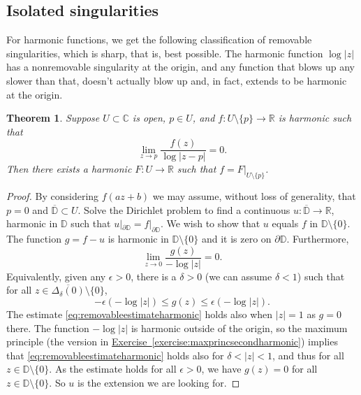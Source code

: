 \documentclass[12pt,openany]{book}
\newcommand{\sabs}[1]{\lvert {#1} \rvert}
\newcommand{\C}{{\mathbb{C}}}
\newcommand{\R}{{\mathbb{R}}}
\newcommand{\D}{{\mathbb{D}}}
\theoremstyle{plain}
\newtheorem{thm}{Theorem}[section]
\theoremstyle{remark}
\theoremstyle{definition}
\theoremstyle{exercise}
\theoremstyle{example}
\newcommand{\exerciseref}[1]{\hyperref[#1]{Exercise~\ref*{#1}}}
\begin{document}
\subsection{Isolated singularities}

For harmonic functions, we get the following classification of removable
singularities, which is sharp, that is, best possible.
The harmonic function $\log \sabs{z}$
has a nonremovable singularity at the origin, and any function
that blows up any slower than that, doesn't actually blow up and, in fact,
extends to be
harmonic at the origin.

\begin{thm}
Suppose $U \subset \C$ is open, $p \in U$, and $f \colon U \setminus \{ p \}
\to \R$ is harmonic such that
\begin{equation*}
\lim_{z\to p} \frac{f(z)}{\log \sabs{z-p}} = 0 .
\end{equation*}
Then there exists a harmonic $F \colon U \to \R$ such that
$f = F|_{U \setminus \{ p \}}$.
\end{thm}

\begin{proof}
By considering $f(a z + b)$ we may assume, without loss of generality,
that $p = 0$ and $\overline{\D} \subset U$.  Solve the Dirichlet problem
to find a continuous $u \colon \overline{\D} \to \R$,
harmonic in $\D$ such that $u|_{\partial \D} = f|_{\partial \D}$.
We wish to show that $u$ equals $f$ in $\D \setminus \{0\}$.
The function
$g = f - u$ is harmonic in $\D \setminus \{ 0 \}$ and it is zero on
$\partial \D$.  Furthermore,
\begin{equation*}
\lim_{z \to 0} \frac{g(z)}{-\log \sabs{z}} = 0.
\end{equation*}
Equivalently, given any $\epsilon > 0$, there is a $\delta > 0$
(we can assume $\delta < 1$)
such that for all $z \in \overline{\Delta_\delta(0)} \setminus \{ 0 \}$,
\begin{equation} \label{eq:removableestimateharmonic}
-\epsilon (- \log\sabs{z})
\leq
g(z)
\leq
\epsilon (- \log\sabs{z}) .
\end{equation}
The estimate \eqref{eq:removableestimateharmonic} holds also when
$\sabs{z}=1$ as $g=0$ there.
The function $-\log\sabs{z}$ is harmonic outside of the origin, so
the maximum principle (the version in
\exerciseref{exercise:maxprincsecondharmonic}) implies that
\eqref{eq:removableestimateharmonic} holds also for $\delta < \sabs{z} < 1$,
and thus for all $z \in \D \setminus \{ 0 \}$.
As the estimate holds for all $\epsilon > 0$, we have $g(z) = 0$ for all
$z \in \D \setminus \{0\}$.  So $u$ is the extension we are looking for.
\end{proof}
\end{document}
